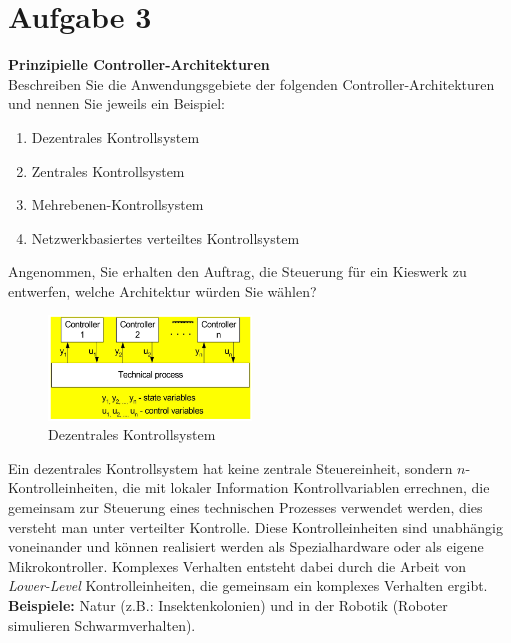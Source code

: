 \documentclass[12pt,a4paper,ngerman]{article}
\begin{document}
\pagebreak


\section{Aufgabe 3}
\begin{framed}
\textbf{Prinzipielle Controller-Architekturen} \\
Beschreiben Sie die Anwendungsgebiete der folgenden Controller-Architekturen und nennen Sie jeweils ein Beispiel:
\begin{enumerate}
\item Dezentrales Kontrollsystem
\item Zentrales Kontrollsystem
\item Mehrebenen-Kontrollsystem
\item Netzwerkbasiertes verteiltes Kontrollsystem
\end{enumerate}
Angenommen, Sie erhalten den Auftrag, die Steuerung für ein Kieswerk zu entwerfen, welche Architektur würden Sie wählen?
\end{framed}

\begin{figure}[h!]

  \begin{center}
    \includegraphics[width=0.48\textwidth]{figures/dezentral.pdf}
  \end{center}
  \caption{Dezentrales Kontrollsystem}
\vspace{-10pt}
\end{figure}
Ein dezentrales Kontrollsystem hat keine zentrale Steuereinheit, sondern $n$-Kontrolleinheiten, die mit lokaler Information Kontrollvariablen errechnen, die gemeinsam zur Steuerung eines technischen Prozesses verwendet werden, dies versteht man unter verteilter Kontrolle. Diese Kontrolleinheiten sind unabhängig voneinander und können realisiert werden als Spezialhardware oder als eigene Mikrokontroller. Komplexes Verhalten entsteht dabei durch die Arbeit von \textit{Lower-Level} Kontrolleinheiten, die gemeinsam ein komplexes Verhalten ergibt. \\
\textbf{Beispiele:} Natur (z.B.: Insektenkolonien) und in der Robotik (Roboter simulieren Schwarmverhalten). 
\vspace{0.5cm}
\end{document}
